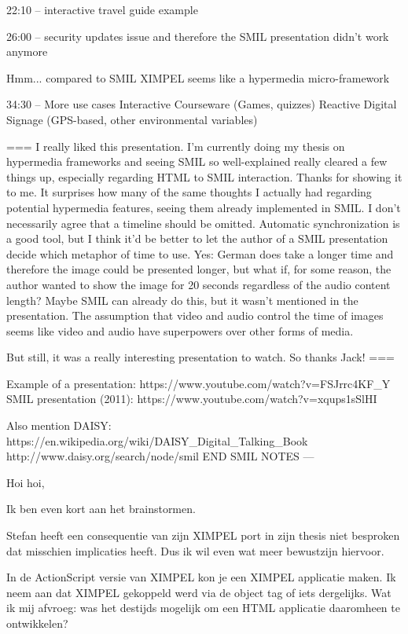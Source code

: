 22:10 -- interactive travel guide example

26:00 -- security updates issue and therefore the SMIL presentation didn't work anymore

Hmm... compared to SMIL XIMPEL seems like a hypermedia micro-framework

34:30 -- More use cases
Interactive Courseware (Games, quizzes)
Reactive Digital Signage (GPS-based, other environmental variables)



===
I really liked this presentation. I'm currently doing my thesis on hypermedia frameworks and seeing SMIL so well-explained really cleared a few things up, especially regarding HTML to SMIL interaction. Thanks for showing it to me. It surprises how many of the same thoughts I actually had regarding potential hypermedia features, seeing them already implemented in SMIL. I don't necessarily agree that a timeline should be omitted. Automatic synchronization is a good tool, but I think it'd be better to let the author of a SMIL presentation decide which metaphor of time to use. Yes: German does take a longer time and therefore the image could be presented longer, but what if, for some reason, the author wanted to show the image for 20 seconds regardless of the audio content length? Maybe SMIL can already do this, but it wasn't mentioned in the presentation. The assumption that video and audio control the time of images seems like video and audio have superpowers over other forms of media.

But still, it was a really interesting presentation to watch. So thanks Jack!﻿
===

Example of a presentation: https://www.youtube.com/watch?v=FSJrrc4KF_Y
SMIL presentation (2011): https://www.youtube.com/watch?v=xqups1sSlHI 

Also mention DAISY: https://en.wikipedia.org/wiki/DAISY_Digital_Talking_Book
http://www.daisy.org/search/node/smil %
END SMIL NOTES
---

Hoi hoi,

Ik ben even kort aan het brainstormen. 

Stefan heeft een consequentie van zijn XIMPEL port in zijn thesis niet besproken dat misschien implicaties heeft. Dus ik wil even wat meer bewustzijn hiervoor.

In de ActionScript versie van XIMPEL kon je een XIMPEL applicatie maken. Ik neem aan dat XIMPEL gekoppeld werd via de object tag of iets dergelijks. Wat ik mij afvroeg: was het destijds mogelijk om een HTML applicatie daaromheen te ontwikkelen?

